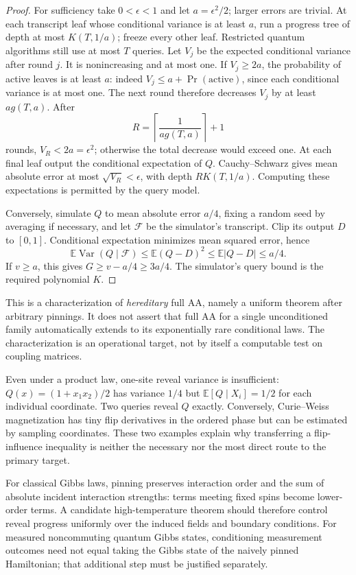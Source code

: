 \begin{proof}
For sufficiency take $0<\epsilon<1$ and let $a=\epsilon^2/2$; larger
errors are trivial. At each transcript leaf whose
conditional variance is at least $a$, run a progress tree of depth at
most $K(T,1/a)$; freeze every other leaf. Restricted quantum algorithms
still use at most $T$ queries. Let $V_j$ be the expected conditional
variance after round $j$. It is nonincreasing and at most one. If
$V_j\ge2a$, the probability of active leaves is at least $a$: indeed
$V_j\le a+\Pr(\text{active})$, since each conditional variance is at
most one. The next round therefore decreases $V_j$ by at least
$a g(T,a)$. After
\[
 R=\left\lceil\frac{1}{a g(T,a)}\right\rceil+1
\]
rounds, $V_R<2a=\epsilon^2$; otherwise the total decrease would exceed
one. At each final leaf output the conditional expectation of $Q$.
Cauchy--Schwarz gives mean absolute error at most $\sqrt{V_R}<\epsilon$,
with depth $RK(T,1/a)$. Computing these expectations is permitted by
the query model.

Conversely, simulate $Q$ to mean absolute error $a/4$, fixing a random
seed by averaging if necessary, and let
$\mathcal F$ be the simulator's transcript. Clip its output $D$ to
$[0,1]$. Conditional expectation minimizes mean squared error, hence
\[
 \mathbb E\operatorname{Var}(Q\mid\mathcal F)
 \le\mathbb E(Q-D)^2\le\mathbb E|Q-D|\le a/4.
\]
If $v\ge a$, this gives $G\ge v-a/4\ge3a/4$. The simulator's query
bound is the required polynomial $K$.
\end{proof}

This is a characterization of \emph{hereditary} full AA, namely a
uniform theorem after arbitrary pinnings. It does not assert that
full AA for a single unconditioned family automatically extends to its
exponentially rare conditional laws. The characterization is an
operational target, not by itself a computable test on coupling matrices.

Even under a product law, one-site reveal variance is insufficient:
$Q(x)=(1+x_1x_2)/2$ has variance $1/4$ but
$\mathbb E[Q\mid X_i]=1/2$ for each individual coordinate. Two queries
reveal $Q$ exactly. Conversely, Curie--Weiss magnetization has tiny
flip derivatives in the ordered phase but can be estimated by sampling
coordinates. These two examples explain why transferring a
flip-influence inequality is neither the necessary nor the most direct
route to the primary target.

For classical Gibbs laws, pinning preserves interaction order and the
sum of absolute incident interaction strengths: terms meeting fixed
spins become lower-order terms. A candidate high-temperature theorem
should therefore control reveal progress uniformly over the induced
fields and boundary conditions. For measured noncommuting quantum
Gibbs states, conditioning measurement outcomes need not equal taking
the Gibbs state of the naively pinned Hamiltonian; that additional
step must be justified separately.
